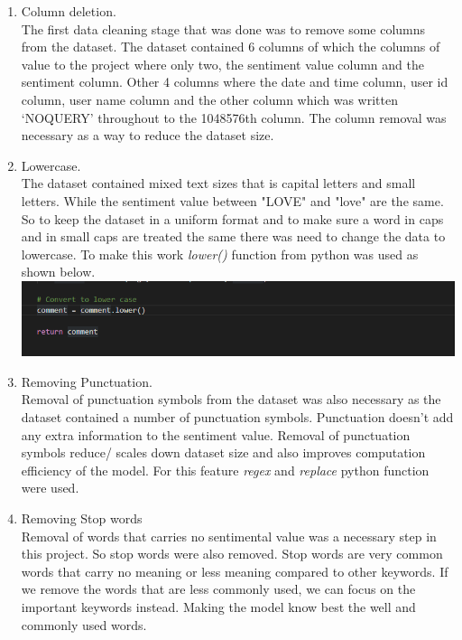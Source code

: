 \documentclass[12pt]{report}
\begin{document}
	\begin{enumerate}
		\item Column deletion.\\
		The first data cleaning stage that was done was to remove some columns from the dataset. The dataset contained 6 columns of which the columns of value to the project where only two, the sentiment value column and the sentiment column. Other 4 columns where the date and time column, user id column, user name column and the other column which was written ‘NOQUERY’ throughout to the 1048576th column. The column removal was necessary as a way to reduce the dataset size.\\
		
		\item Lowercase.\\
		The dataset contained mixed text sizes that is capital letters and small letters. While the sentiment value between "LOVE" and "love" are the same. So to keep the dataset in a uniform format and to make sure a word in caps and in small caps are treated the same there was need to change the data to lowercase. To make this work \textit{lower()} function from python was used as shown below.\\
		
			\includegraphics[scale=0.5]{lowercase.PNG}
		
		\item Removing Punctuation.\\
		Removal of punctuation symbols from the dataset was also necessary as the dataset contained a number of punctuation symbols. Punctuation doesn't add any extra information to the sentiment value. Removal of punctuation symbols reduce/ scales down dataset size and also improves computation efficiency of the model. For this feature \textit{regex} and \textit{replace} python function were used.\\
		
		\item Removing Stop words\\
		Removal of words that carries no sentimental value was a necessary step in this project. So stop words were also removed. Stop words are very common words that carry no meaning or less meaning compared to other keywords. If we remove the words that are less commonly used, we can focus on the important keywords instead. Making the model know best the well and commonly used words.\\
		

\end{enumerate}
\end{document}
